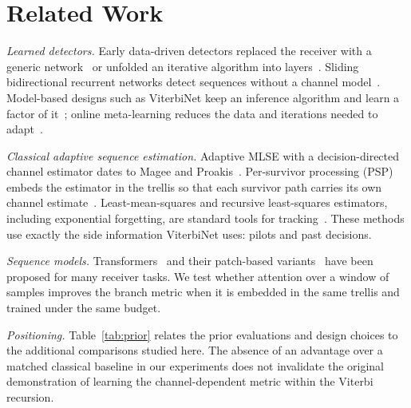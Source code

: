 \documentclass[journal]{IEEEtran}
\begin{document}
\section{Related Work}
\emph{Learned detectors.} Early data-driven detectors replaced the receiver with a generic network~\cite{oshea2017intro,ye2018power} or unfolded an iterative algorithm into layers~\cite{samuel2019learning}. Sliding bidirectional recurrent networks detect sequences without a channel model~\cite{farsad2018neural}. Model-based designs such as ViterbiNet keep an inference algorithm and learn a factor of it~\cite{shlezinger2023mbdl,shlezinger2020viterbinet}; online meta-learning reduces the data and iterations needed to adapt~\cite{raviv2021metaviterbinet,raviv2023online}.

\emph{Classical adaptive sequence estimation.} Adaptive MLSE with a decision-directed channel estimator dates to Magee and Proakis~\cite{magee1973adaptive}. Per-survivor processing (PSP) embeds the estimator in the trellis so that each survivor path carries its own channel estimate~\cite{raheli1995psp}. Least-mean-squares and recursive least-squares estimators, including exponential forgetting, are standard tools for tracking~\cite{haykin2014adaptive}. These methods use exactly the side information ViterbiNet uses: pilots and past decisions.

\emph{Sequence models.} Transformers~\cite{vaswani2017attention} and their patch-based variants~\cite{dosovitskiy2021vit} have been proposed for many receiver tasks. We test whether attention over a window of samples improves the branch metric when it is embedded in the same trellis and trained under the same budget.

\emph{Positioning.} Table~\ref{tab:prior} relates the prior evaluations and design choices to the additional comparisons studied here. The absence of an advantage over a matched classical baseline in our experiments does not invalidate the original demonstration of learning the channel-dependent metric within the Viterbi recursion.
\end{document}
